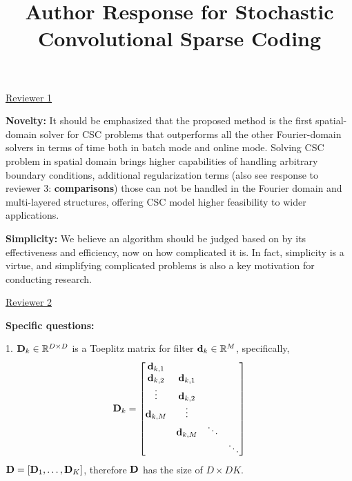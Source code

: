 \documentclass[10pt,twocolumn,letterpaper]{article}
\begin{document}
\title{Author Response for Stochastic Convolutional Sparse Coding}  %

\maketitle
\thispagestyle{empty}

\underline{Reviewer 1}

\textbf{Novelty:} It should be emphasized that the proposed method is
the first spatial-domain solver for CSC problems that outperforms all
the other Fourier-domain solvers in terms of time both in batch mode
and online mode. Solving CSC problem in spatial domain brings higher
capabilities of handling arbitrary boundary conditions, additional
regularization terms (also see response to reviewer 3:
\textbf{comparisons}) those can not be handled in the Fourier domain
and multi-layered structures, offering CSC model higher feasibility to
wider applications.

\textbf{Simplicity:} We believe an algorithm should be judged based on
by its effectiveness and efficiency, now on how complicated it is. In
fact, simplicity is a virtue, and simplifying complicated problems is
also a key motivation for conducting research.

\underline{Reviewer 2}

\textbf{Specific questions:}

1. $\Filter_k \in \mathbb{R}^{D \times D}$ is a Toeplitz matrix for filter $\filter_k \in \mathbb{R}^{M}$, specifically,
\begin{equation}\label{toeplitz}
 \Filter_k =
 \begin{bmatrix}
    \filter_{k,1} \\
    \filter_{k,2} & \filter_{k,1}\\
    \vdots        & \filter_{k,2}\\
    \filter_{k,M} & \vdots       \\
                  & \filter_{k,M} & \ddots\\
                  &               &        & \ddots
  \end{bmatrix}
\end{equation}
$\Filter = [\Filter_1, \dots, \Filter_K]$, therefore $\Filter$ has the size of $D \times DK$.
\end{document}
